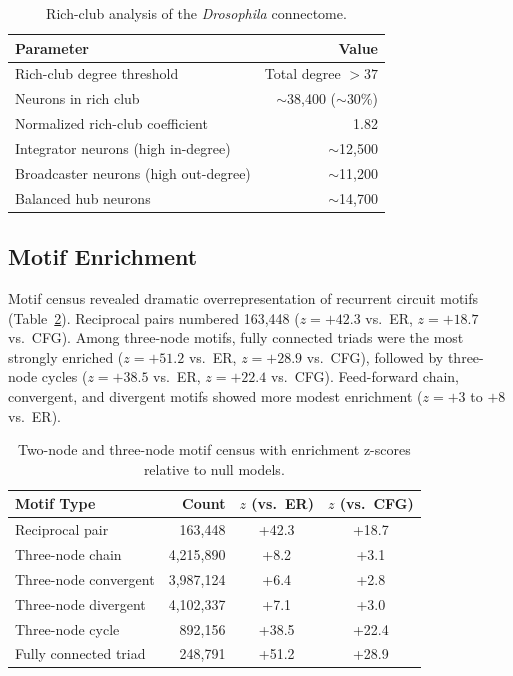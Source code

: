 \documentclass[11pt]{article}
\begin{document}
\begin{table}[ht]
\centering
\caption{Rich-club analysis of the \textit{Drosophila} connectome.}
\label{tab:richclub}
\begin{tabular}{@{}lr@{}}
\toprule
Parameter & Value \\
\midrule
Rich-club degree threshold & Total degree $> 37$ \\
Neurons in rich club & $\sim$38,400 ($\sim$30\%) \\
Normalized rich-club coefficient & 1.82 \\
Integrator neurons (high in-degree) & $\sim$12,500 \\
Broadcaster neurons (high out-degree) & $\sim$11,200 \\
Balanced hub neurons & $\sim$14,700 \\
\bottomrule
\end{tabular}
\end{table}

\subsection{Motif Enrichment}

Motif census revealed dramatic overrepresentation of recurrent circuit motifs (Table~\ref{tab:motifs}). Reciprocal pairs numbered 163,448 ($z = +42.3$ vs.\ ER, $z = +18.7$ vs.\ CFG). Among three-node motifs, fully connected triads were the most strongly enriched ($z = +51.2$ vs.\ ER, $z = +28.9$ vs.\ CFG), followed by three-node cycles ($z = +38.5$ vs.\ ER, $z = +22.4$ vs.\ CFG). Feed-forward chain, convergent, and divergent motifs showed more modest enrichment ($z = +3$ to $+8$ vs.\ ER).

\begin{table}[ht]
\centering
\caption{Two-node and three-node motif census with enrichment z-scores relative to null models.}
\label{tab:motifs}
\begin{tabular}{@{}lrcc@{}}
\toprule
Motif Type & Count & $z$ (vs.\ ER) & $z$ (vs.\ CFG) \\
\midrule
Reciprocal pair & 163,448 & +42.3 & +18.7 \\
Three-node chain & 4,215,890 & +8.2 & +3.1 \\
Three-node convergent & 3,987,124 & +6.4 & +2.8 \\
Three-node divergent & 4,102,337 & +7.1 & +3.0 \\
Three-node cycle & 892,156 & +38.5 & +22.4 \\
Fully connected triad & 248,791 & +51.2 & +28.9 \\
\bottomrule
\end{tabular}
\end{table}
\end{document}
